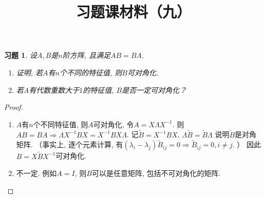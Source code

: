 \documentclass{ctexart}
\newtheorem{exercise}[thm]{习题}
\def\wtd{\widetilde}
\begin{document}
\title{习题课材料（九）}
\author{}
\date{}
\maketitle

\begin{exercise}
设$A, B$是$n$阶方阵, 且满足$AB=BA$. 
\begin{enumerate}
\item 证明, 若$A$有$n$个不同的特征值, 则$B$可对角化. 
\item 若$A$有代数重数大于$1$的特征值, $B$是否一定可对角化？
\end{enumerate}
\end{exercise}
\begin{proof}
	\begin{enumerate}
		\item $A$有$n$个不同特征值, 则$A$可对角化, 令$A=X\Lambda X^{-1}$. 
			则$AB=BA\Rightarrow \Lambda X^{-1}BX=X^{-1}BX\Lambda$. 
			记$\wtd B=X^{-1}BX$, 
			$\Lambda \wtd B=\wtd B\Lambda$ 说明$\wtd B$是对角矩阵. 
			（事实上, 逐个元素计算, 有$(\lambda_i-\lambda_j)\wtd B_{ij}=0\Rightarrow \wtd B_{ij}=0,i\ne j$. ）
			因此$B=X\wtd BX^{-1}$可对角化. 
			\item 不一定. 例如$A=I$, 则$B$可以是任意矩阵, 包括不可对角化的矩阵. 
	\end{enumerate}
\end{proof}
\end{document}
